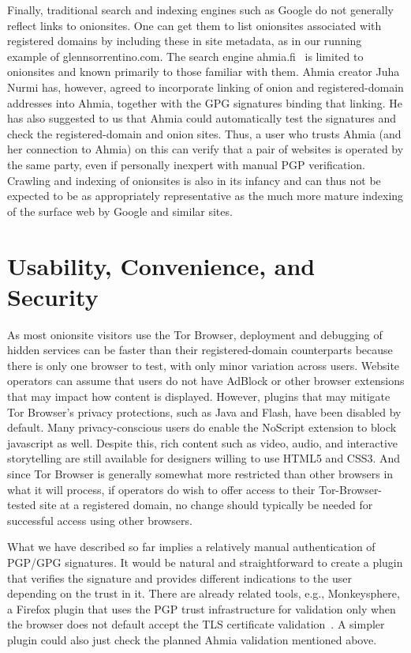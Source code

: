 \documentclass[10pt]{styles/IEEEtran}
\begin{document}
Finally, traditional search and indexing engines such as Google do not
generally reflect links to onionsites. One can get them to list
onionsites associated with registered domains by including these in
site metadata, as in our running example of glennsorrentino.com.
The search engine
ahmia.fi~\cite{ahmia} is limited to onionsites and known primarily to
those familiar with them. Ahmia creator Juha Nurmi has, however,
agreed to incorporate linking of onion and registered-domain addresses into
Ahmia, together with the GPG signatures binding that linking.  He has
also suggested to us that Ahmia could automatically test the
signatures and check the registered-domain and onion sites. Thus, a user who
trusts Ahmia (and her connection to Ahmia) on this can verify that a
pair of websites is operated by the same party, even if personally
inexpert with manual PGP verification. Crawling and indexing of
onionsites is also in its infancy and can thus not be expected to be
as appropriately representative as the much more mature indexing of
the surface web by Google and similar sites.

\section{Usability, Convenience, and Security}

As most onionsite visitors use the Tor Browser, deployment and
debugging of hidden services can be faster than their registered-domain
counterparts because there is only one browser to test, with only
minor variation across users.  Website operators can assume that users
do not have AdBlock or other browser extensions that may impact how
content is displayed.  However, plugins that may mitigate Tor
Browser's privacy protections, such as Java and Flash, have been
disabled by default.  Many privacy-conscious users do enable the
NoScript extension to block javascript as well.  Despite this, rich
content such as video, audio, and interactive storytelling are still
available for designers willing to use HTML5 and CSS3.
And since Tor Browser is generally somewhat more restricted than other
browsers in what it will process, if operators do wish to offer access
to their Tor-Browser-tested site at a registered domain, no change
should typically be needed for successful access using other browsers.

What we have described so far implies a relatively manual
authentication of PGP/GPG signatures. It would be natural and
straightforward to create a plugin that verifies the signature and
provides different indications to the user depending on the trust in
it.  There are already related tools, e.g., Monkeysphere, a Firefox
plugin that uses the PGP trust infrastructure for validation only when
the browser does not default accept the TLS certificate
validation~\cite{monkeysphere}. A simpler plugin could also
just check the planned Ahmia validation mentioned above.
\end{document}
